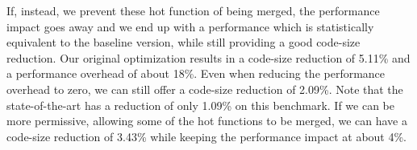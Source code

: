 If, instead, we prevent these hot function of being merged, the performance
impact goes away and we end up with a performance which is statistically
equivalent to the baseline version, while still providing a good code-size
reduction.
Our original optimization results in a code-size reduction of 5.11\% and a
performance overhead of about 18\%.
Even when reducing the performance overhead to zero, we can still offer a
code-size reduction of 2.09\%.
Note that the state-of-the-art has a reduction of only 1.09\% on this benchmark.
If we can be more permissive, allowing some of the hot functions to be merged,
we can have a code-size reduction of 3.43\% while keeping the performance impact
at about 4\%.





